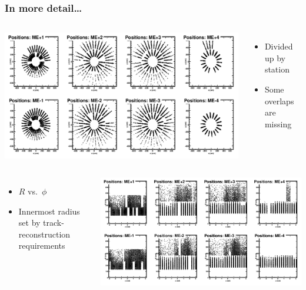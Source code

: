 \documentclass[compress]{beamer}
\begin{document}
\begin{frame}
\frametitle{In more detail\ldots}

\begin{columns}
\includegraphics[width=\linewidth]{xypos.png}

\begin{itemize}
\item Divided up by station
\item Some overlaps are missing
\end{itemize}
\end{columns}

\begin{columns}
\begin{itemize}
\item $R$ vs.\ $\phi$
\item Innermost radius set by track-reconstruction requirements
\end{itemize}

\includegraphics[width=\linewidth]{rphipos.png}
\end{columns}
\end{frame}
\end{document}

